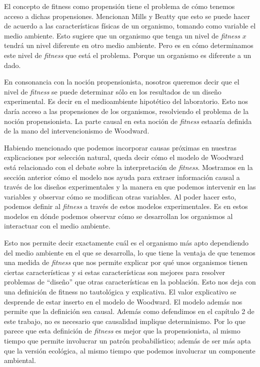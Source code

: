El concepto de fitness como propensión tiene el problema de cómo tenemos acceso a dichas propensiones. Mencionan Mills y Beatty \cite{Mills1979} que esto se puede hacer de acuerdo a las características físicas de un organismo, tomando como variable el medio ambiente. Esto sugiere que un organismo que tenga un nivel de \emph{fitness} $x$ tendrá un nivel diferente en otro medio ambiente. Pero es en cómo determinamos este nivel de \emph{fitness} que está el problema. Porque un organismo es diferente a un dado.

En consonancia con la noción propensionista, nosotros queremos decir que el nivel de \emph{fitness} se puede determinar sólo en los resultados de un diseño experimental. Es decir en el medioambiente hipotético del laboratorio. Esto nos daría acceso a las propensiones de los organismos, resolviendo el problema de la noción propensionista. La parte causal en esta noción de \emph{fitness} estaaría definida de la mano del intervencionismo de Woodward. 

Habiendo mencionado que podemos incorporar causas próximas en nuestras explicaciones por selección natural, queda decir cómo el modelo de Woodward está relacionado con el debate sobre la interpretación de \emph{fitness}. Mostramos en la sección anterior cómo el modelo nos ayuda para extraer información causal a través de los diseños experimentales y la manera en que podemos intervenir en las variables y observar cómo se modifican otras variables. Al poder hacer esto, podemos definir al \emph{fitness} a través de estos modelos experimentales. Es en estos modelos en dónde podemos observar cómo se desarrollan los organismos al interactuar con el medio ambiente.

Esto nos permite decir exactamente cuál es el organismo más apto dependiendo del medio ambiente en el que se desarrolla, lo que tiene la ventaja de que tenemos una medida de \emph{fitness} que nos permite explicar por qué unos organismos tienen ciertas características y si estas características son mejores para resolver problemas de ``diseño'' que otras características en la población. Esto nos deja con una definición de fitness no tautológica y explicativa. El valor explicativo se desprende de estar inserto en el modelo de Woodward. El modelo además nos permite que la definición sea causal. Además como defendimos en el capítulo 2 de este trabajo, no es necesario que causalidad implique determinismo. Por lo que parece que esta definición de \emph{fitness} es mejor que la propensionista, al mismo tiempo que permite involucrar un patrón probabilístico; además de ser más apta que la versión ecológica, al mismo tiempo que podemos involucrar un componente ambiental.

